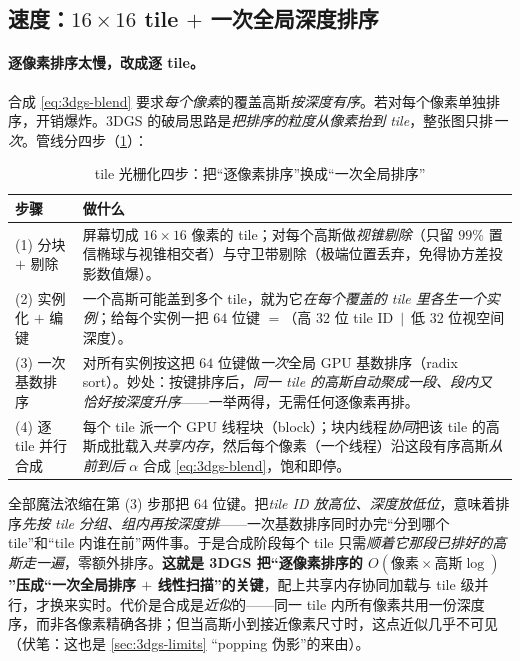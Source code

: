 \subsection{速度：\texorpdfstring{$16\times16$}{16x16} tile \texorpdfstring{$+$}{+} 一次全局深度排序}

\paragraph{逐像素排序太慢，改成逐 tile。}
合成 \cref{eq:3dgs-blend} 要求\emph{每个像素}的覆盖高斯\emph{按深度有序}。若对每个像素单独排序，开销爆炸。3DGS 的破局思路是\emph{把排序的粒度从像素抬到 tile}，整张图只排\emph{一次}。管线分四步（\cref{tab:3dgs-tile}）：

\begin{table}[H]\centering
\caption{tile 光栅化四步：把“逐像素排序”换成“一次全局排序”}
\label{tab:3dgs-tile}
\small
\begin{tabular}{@{}p{}p{}@{}}
\toprule
步骤 & 做什么 \\
\midrule
(1) 分块 $+$ 剔除 & 屏幕切成 $16\times16$ 像素的 tile；对每个高斯做\emph{视锥剔除}（只留 $99\%$ 置信椭球与视锥相交者）与守卫带剔除（极端位置丢弃，免得协方差投影数值爆）。\\
(2) 实例化 $+$ 编键 & 一个高斯可能盖到多个 tile，就为它\emph{在每个覆盖的 tile 里各生一个实例}；给每个实例一把 $64$ 位键 $=$（高 $32$ 位 tile ID $\,|\,$ 低 $32$ 位视空间深度）。\\
(3) 一次基数排序 & 对所有实例按这把 $64$ 位键做\emph{一次}全局 GPU 基数排序（radix sort）。妙处：按键排序后，\emph{同一 tile 的高斯自动聚成一段、段内又恰好按深度升序}——一举两得，无需任何逐像素再排。\\
(4) 逐 tile 并行合成 & 每个 tile 派一个 GPU 线程块（block）；块内线程\emph{协同}把该 tile 的高斯成批载入\emph{共享内存}，然后每个像素（一个线程）沿这段有序高斯\emph{从前到后} $\alpha$ 合成 \cref{eq:3dgs-blend}，饱和即停。\\
\bottomrule
\end{tabular}
\end{table}

\begin{insight}
全部魔法浓缩在第 (3) 步那把 $64$ 位键。把\emph{tile ID 放高位、深度放低位}，意味着排序\emph{先按 tile 分组、组内再按深度排}——一次基数排序同时办完“分到哪个 tile”和“tile 内谁在前”两件事。于是合成阶段每个 tile 只需\emph{顺着它那段已排好的高斯走一遍}，零额外排序。\textbf{这就是 3DGS 把“逐像素排序的 $O(\text{像素}\times\text{高斯}\log)$”压成“一次全局排序 $+$ 线性扫描”的关键}，配上共享内存协同加载与 tile 级并行，才换来实时。代价是合成是\emph{近似}的——同一 tile 内所有像素共用一份深度序，而非各像素精确各排；但当高斯小到接近像素尺寸时，这点近似几乎不可见（伏笔：这也是 \cref{sec:3dgs-limits} “popping 伪影”的来由）。
\end{insight}

